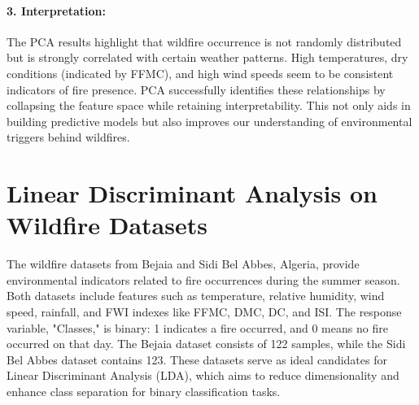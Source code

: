 \documentclass[12pt]{article}
\begin{document}
\paragraph{3. Interpretation:}  
The PCA results highlight that wildfire occurrence is not randomly distributed but is strongly correlated with certain weather patterns. High temperatures, dry conditions (indicated by FFMC), and high wind speeds seem to be consistent indicators of fire presence. PCA successfully identifies these relationships by collapsing the feature space while retaining interpretability. This not only aids in building predictive models but also improves our understanding of environmental triggers behind wildfires.


\newpage


\section*{Linear Discriminant Analysis on Wildfire Datasets}

The wildfire datasets from Bejaia and Sidi Bel Abbes, Algeria, provide environmental indicators related to fire occurrences during the summer season. Both datasets include features such as temperature, relative humidity, wind speed, rainfall, and FWI indexes like FFMC, DMC, DC, and ISI. The response variable, "Classes," is binary: 1 indicates a fire occurred, and 0 means no fire occurred on that day. The Bejaia dataset consists of 122 samples, while the Sidi Bel Abbes dataset contains 123. These datasets serve as ideal candidates for Linear Discriminant Analysis (LDA), which aims to reduce dimensionality and enhance class separation for binary classification tasks.
\end{document}
